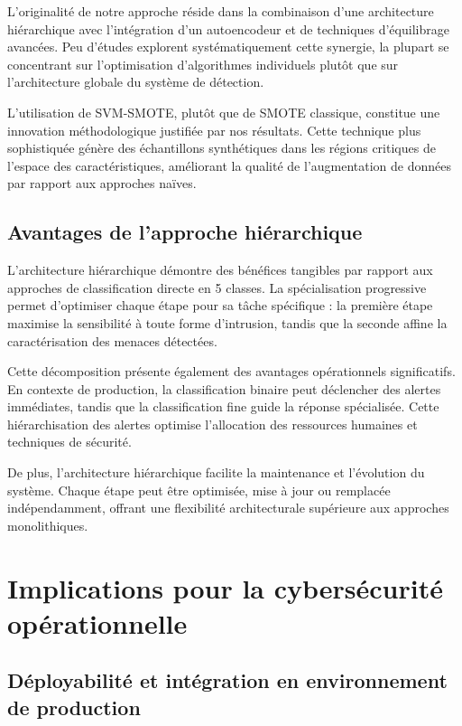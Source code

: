 L'originalité de notre approche réside dans la combinaison d'une architecture hiérarchique avec l'intégration d'un autoencodeur et de techniques d'équilibrage avancées. Peu d'études explorent systématiquement cette synergie, la plupart se concentrant sur l'optimisation d'algorithmes individuels plutôt que sur l'architecture globale du système de détection.

L'utilisation de SVM-SMOTE, plutôt que de SMOTE classique, constitue une innovation méthodologique justifiée par nos résultats. Cette technique plus sophistiquée génère des échantillons synthétiques dans les régions critiques de l'espace des caractéristiques, améliorant la qualité de l'augmentation de données par rapport aux approches naïves.

\subsection{Avantages de l'approche hiérarchique}

L'architecture hiérarchique démontre des bénéfices tangibles par rapport aux approches de classification directe en 5 classes. La spécialisation progressive permet d'optimiser chaque étape pour sa tâche spécifique : la première étape maximise la sensibilité à toute forme d'intrusion, tandis que la seconde affine la caractérisation des menaces détectées.

Cette décomposition présente également des avantages opérationnels significatifs. En contexte de production, la classification binaire peut déclencher des alertes immédiates, tandis que la classification fine guide la réponse spécialisée. Cette hiérarchisation des alertes optimise l'allocation des ressources humaines et techniques de sécurité.

De plus, l'architecture hiérarchique facilite la maintenance et l'évolution du système. Chaque étape peut être optimisée, mise à jour ou remplacée indépendamment, offrant une flexibilité architecturale supérieure aux approches monolithiques.

\section{Implications pour la cybersécurité opérationnelle}

\subsection{Déployabilité et intégration en environnement de production}

